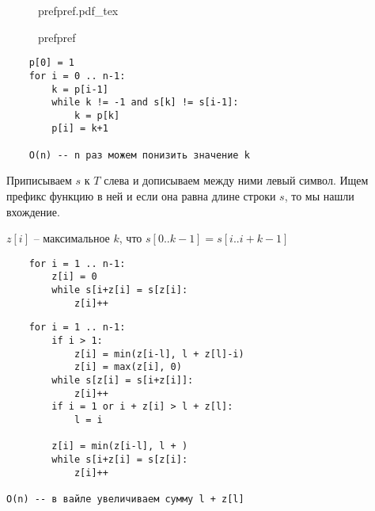 \documentclass{book}
\theoremstyle{definition}
\newcommand{\incfig}[1]{%
    \def\svgwidth{\columnwidth}
    {#1.pdf_tex}
}
\begin{document}
\begin{figure}[!ht]
    \centering
    \incfig{prefpref}
    \caption{prefpref}
    \label{fig:prefpref}
\end{figure}

\begin{lstlisting}
    p[0] = 1
    for i = 0 .. n-1:
        k = p[i-1]
        while k != -1 and s[k] != s[i-1]:
            k = p[k]
        p[i] = k+1

    O(n) -- n раз можем понизить значение k
\end{lstlisting}

Приписываем $s$ к  $T$ слева и дописываем между ними левый символ. Ищем префикс функцию в ней и если она равна длине строки  $s$, то мы нашли вхождение.

 \begin{theorem}
    $z[i]$ -- максимальное $k$, что  $s[0..k-1] = s[i .. i+k-1]$
\end{theorem}

\begin{lstlisting}
    for i = 1 .. n-1:
        z[i] = 0
        while s[i+z[i] = s[z[i]:
            z[i]++
\end{lstlisting}        

\begin{lstlisting}
    for i = 1 .. n-1:
        if i > 1:
            z[i] = min(z[i-l], l + z[l]-i)
            z[i] = max(z[i], 0)
        while s[z[i] = s[i+z[i]]:
            z[i]++
        if i = 1 or i + z[i] > l + z[l]:
            l = i

        z[i] = min(z[i-l], l + )
        while s[i+z[i] = s[z[i]:
            z[i]++

O(n) -- в вайле увеличиваем сумму l + z[l]
\end{lstlisting}        
\end{document}
